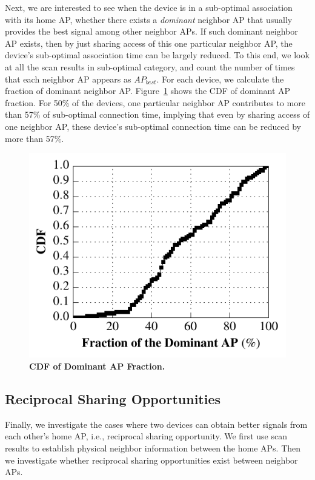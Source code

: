 Next, we are interested to see when the device is in a sub-optimal association
with its home AP, whether there exists a \textit{dominant} neighbor AP that
usually provides the best signal among other neighbor APs. If such dominant
neighbor AP exists, then by just sharing access of this one particular neighbor
AP, the device's sub-optimal association time can be largely reduced. To this
end, we look at all the scan results in sub-optimal category, and count the
number of times that each neighbor AP appears as $AP_{best}$. For each device,
we calculate the fraction of dominant neighbor AP. Figure~\ref{fig:dominantap}
shows the CDF of dominant AP fraction. For 50\% of the devices, one particular
neighbor AP contributes to more than 57\% of sub-optimal connection time,
implying that even by sharing \wifi{} access of one neighbor AP, these device's
sub-optimal connection time can be reduced by more than 57\%.

\begin{figure}[t]
  \centering
  \includegraphics[width=\columnwidth]{./figures/BetterNeighborAPFigure.pdf}
  \caption{\textbf{CDF of Dominant AP Fraction.}}
  \label{fig:dominantap}
\end{figure}


\subsection{Reciprocal Sharing Opportunities}
\label{subsec:reciprocal}

Finally, we investigate the cases where two devices can obtain better signals
from each other's home AP, i.e., reciprocal sharing opportunity. We first use
scan results to establish physical neighbor information between the home APs.
Then we investigate whether reciprocal sharing opportunities exist between
neighbor APs.

